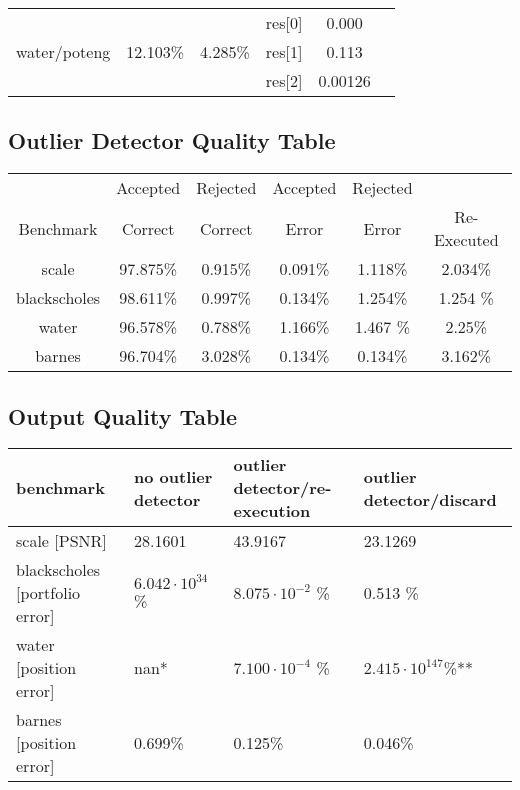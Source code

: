 \documentclass[11pt]{article}
\begin{document}
\begin {table*}[t]
\begin{tabular}{c|ccccc}
	\hline
	\multirow{3}{*}{water/poteng} & \multirow{3}{*}{12.103\%} & \multirow{3}{*}{4.285\%} & res[0] & 0.000\\
	&  &  & res[1] & 0.113\\
	&  &  & res[2] & 0.00126\\
	
\end{tabular}
\label{fig:fnpred}
\caption{Error bounds analysis.}
\end{table*}

\subsection {Outlier Detector Quality Table}

\begin{table*}[t]
\centering
\footnotesize
\begin{tabular}{c|ccccc|}
	          & Accepted & Rejected & Accepted    & Rejected  &  \\
	Benchmark & Correct & Correct &  Error        &  Error & Re-Executed \\
	\hline
	scale & 97.875\% & 0.915\% &  0.091\% &1.118\% & 2.034\%\\
	blackscholes & 98.611\% &0.997\%   &0.134\%  &  1.254\%& 1.254 \% \\
	water & 96.578\% & 0.788\% & 1.166\% & 1.467 \% & 2.25\%\\
	barnes & 96.704\% & 3.028\% & 0.134\% & 0.134\% & 3.162\%\\
\end{tabular}
\caption {control-based outlier detector quality }
\label{tbl:outlier}
\end{table*}

\subsection {Output Quality Table}

\begin{table*}[t]
\centering
\footnotesize
\begin{tabular}{l|lll}
	benchmark & no outlier detector & outlier detector/re-execution & outlier detector/discard\\
	\hline
	scale [PSNR] & 28.1601 & 43.9167 & 23.1269\\
	blackscholes [portfolio error] &$6.042\cdot 10^{34}$\% &  $8.075 \cdot 10^{-2}$ \% & 0.513 \%\\
	water [position error] & nan* & $7.100 \cdot 10^{-4}$ \% & $2.415 \cdot 10^{147}$\%** \\
	barnes [position error]& 0.699\% & 0.125\% & 0.046\%\\
\end{tabular}
\caption {output quality without, with control outlier detector. (*) after the first time step, all positions go to nan. (**) spurious nans as positions, a few bad values badly skew the output.}
\label{tbl:replace}
\end {table*}
\end{document}
